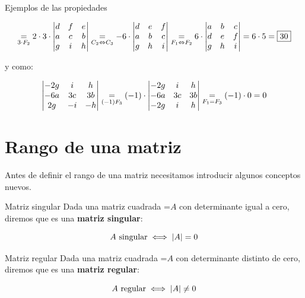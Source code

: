 \documentclass[11pt,a4paper]{article}
\newcommand{\fmm}[1]{\setbox0=\hbox{$#1$}\ifdim\wd0>\linewidth\fmdisp{#1}\else\mbox{\box0}\fi}
\newcommand{\fmdisp}[1]{\[\setbox2=\hbox{$\displaystyle #1$}\ifdim\wd2>\linewidth\resizebox{\linewidth}{!}{\box2}\else\box2\fi\]}
\begin{document}
\begin{fmex}{Ejemplos de las propiedades}
\begin{enumerate}[label=\textbf{\arabic*.},leftmargin=*]
\fmdisp{\underset{3\cdot F_2}{=}2\cdot3\cdot\begin{vmatrix}d & f & e\\ a & c & b\\ g & i & h\end{vmatrix}\underset{C_2\Leftrightarrow C_3}{=}-6\cdot\begin{vmatrix}d & e & f\\ a & b & c\\ g & h & i\end{vmatrix}\underset{F_1\Leftrightarrow F_2}{=}6\cdot\begin{vmatrix}a & b & c\\ d & e & f\\ g & h & i\end{vmatrix}=6\cdot5=\boxed{30}}

y como:

\fmdisp{\begin{vmatrix}-2g & i & h\\ -6a & 3c & 3b\\ 2g & -i & -h\end{vmatrix}\underset{(-1)F_3}{=}(-1)\cdot\begin{vmatrix}-2g & i & h\\ -6a & 3c & 3b\\ -2g & i & h\end{vmatrix}\underset{F_1=F_3}{=}(-1)\cdot0=0}

\end{enumerate}
\end{fmex}

\section{Rango de una matriz}\hypertarget{sec5}{}

Antes de definir el rango de una matriz necesitamos introducir algunos conceptos nuevos.

\begin{fmdef}{Matriz singular}
Dada una matriz cuadrada \fmm{A} con determinante igual a cero, diremos que es una \textbf{matriz singular}:

\fmdisp{A\ \text{singular}\iff|A|=0}

\end{fmdef}

\begin{fmdef}{Matriz regular}
Dada una matriz cuadrada \fmm{A} con determinante distinto de cero, diremos que es una \textbf{matriz regular}:

\fmdisp{A\ \text{regular}\iff|A|\neq0}

\end{fmdef}
\end{document}
